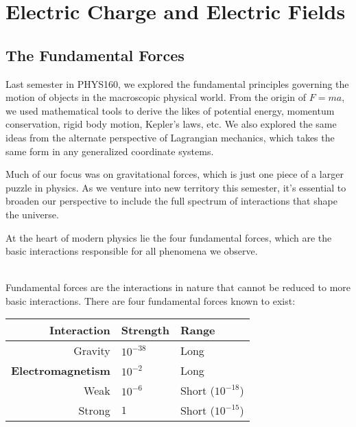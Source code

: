 \graphicspath{{img/ch1}}

\chapter{Electric Charge and Electric Fields}
\setcounter{section}{-1}
\section{The Fundamental Forces}
Last semester in PHYS160, we explored the fundamental principles governing the motion of objects in the macroscopic physical world. From the origin of $F=ma$, we used mathematical tools to derive the likes of potential energy, momentum conservation, rigid body motion, Kepler's laws, etc. We also explored the same ideas from the alternate perspective of Lagrangian mechanics, which takes the same form in any generalized coordinate systems.\par
Much of our focus was on gravitational forces, which is just one piece of a larger puzzle in physics. As we venture into new territory this semester, it's essential to broaden our perspective to include the full spectrum of interactions that shape the universe.\par
At the heart of modern physics lie the four fundamental forces, which are the basic interactions responsible for all phenomena we observe.
\begin{definition}
    \ \\Fundamental forces are the interactions in nature that cannot be reduced to more basic interactions. There are four fundamental forces known to exist:\vspace{5pt}
    \begin{center}
        \begin{tabular}{rll}
            \toprule
            \bfseries Interaction & \bfseries Strength & \bfseries Range\\
            \midrule
            Gravity & $10^{-38}$ & Long\\
            \bfseries Electromagnetism & $10^{-2}$ & Long\\
            Weak & $10^{-6}$ & Short ($10^{-18}$)\\
            Strong & $1$ & Short ($10^{-15}$)\\
            \bottomrule
        \end{tabular}
    \end{center}
\end{definition}
\vspace{-12pt}
